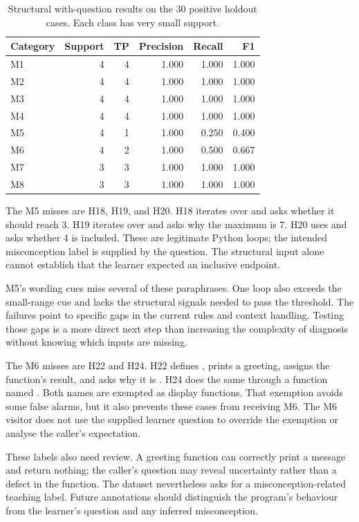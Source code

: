 \begin{table}[htbp]
\centering\footnotesize
\caption{Structural with-question results on the 30 positive holdout cases. Each class has very small support.}
\label{tab:classes}
\begin{tabular}{lrrrrr}
\toprule
Category & Support & TP & Precision & Recall & F1\\
\midrule
M1 & 4 & 4 & 1.000 & 1.000 & 1.000\\
M2 & 4 & 4 & 1.000 & 1.000 & 1.000\\
M3 & 4 & 4 & 1.000 & 1.000 & 1.000\\
M4 & 4 & 4 & 1.000 & 1.000 & 1.000\\
M5 & 4 & 1 & 1.000 & 0.250 & 0.400\\
M6 & 4 & 2 & 1.000 & 0.500 & 0.667\\
M7 & 3 & 3 & 1.000 & 1.000 & 1.000\\
M8 & 3 & 3 & 1.000 & 1.000 & 1.000\\
\bottomrule
\end{tabular}
\end{table}

The M5 misses are H18, H19, and H20. H18 iterates over  and asks whether it should reach 3. H19 iterates over  and asks why the maximum is 7. H20 uses  and asks whether 4 is included. These are legitimate Python loops; the intended misconception label is supplied by the question. The structural input alone cannot establish that the learner expected an inclusive endpoint.

M5's wording cues miss several of these paraphrases. One loop also exceeds the small-range cue and lacks the structural signals needed to pass the threshold. The failures point to specific gaps in the current rules and context handling. Testing those gaps is a more direct next step than increasing the complexity of diagnosis without knowing which inputs are missing.

The M6 misses are H22 and H24. H22 defines , prints a greeting, assigns the function's result, and asks why it is . H24 does the same through a function named . Both names are exempted as display functions. That exemption avoids some false alarms, but it also prevents these cases from receiving M6. The M6 visitor does not use the supplied learner question to override the exemption or analyse the caller's expectation.

These labels also need review. A greeting function can correctly print a message and return nothing; the caller's question may reveal uncertainty rather than a defect in the function. The dataset nevertheless asks for a misconception-related teaching label. Future annotations should distinguish the program's behaviour from the learner's question and any inferred misconception.


